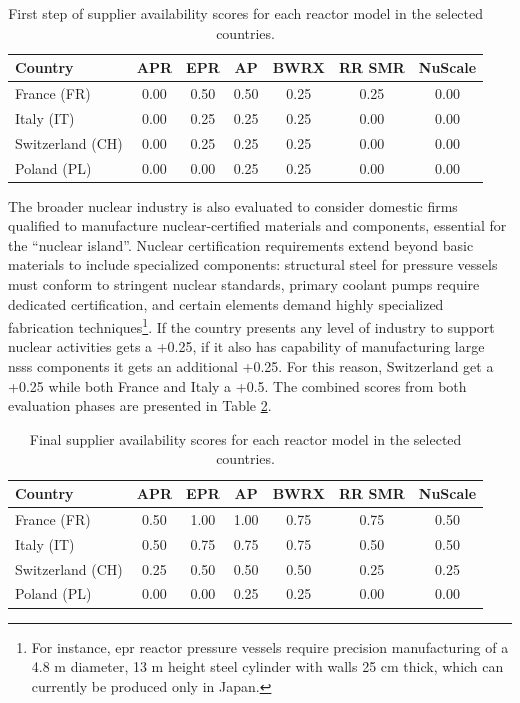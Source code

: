 \begin{table}[!ht]
    \centering
    \begin{tabularx}{\textwidth}{X c c c c c c}
        \toprule
        \textbf{Country} & \textbf{APR} & \textbf{EPR} & \textbf{AP} & \textbf{BWRX} & \textbf{RR SMR} & \textbf{NuScale} \\
        \midrule
        France (FR)       & 0.00 & 0.50 & 0.50 & 0.25 & 0.25 & 0.00 \\
        Italy (IT)       & 0.00 & 0.25 & 0.25 & 0.25 & 0.00 & 0.00 \\
        Switzerland (CH)  & 0.00 & 0.25 & 0.25 & 0.25 & 0.00 & 0.00 \\
        Poland (PL)       & 0.00 & 0.00 & 0.25 & 0.25 & 0.00 & 0.00 \\
        \bottomrule
    \end{tabularx}
    \caption{First step of supplier availability scores for each reactor model in the selected countries.}
    \label{tab:supplier-availability-step1}
\end{table}

The broader nuclear industry is also evaluated to consider domestic firms qualified to manufacture nuclear-certified materials and components, essential for the “nuclear island”. Nuclear certification requirements extend beyond basic materials to include specialized components: structural steel for pressure vessels must conform to stringent nuclear standards, primary coolant pumps require dedicated certification, and certain elements demand highly specialized fabrication techniques\footnote{For instance, \gls{epr} reactor pressure vessels require precision manufacturing of a 4.8 m diameter, 13 m height steel cylinder with walls 25 cm thick, which can currently be produced only in Japan.}. If the country presents any level of industry to support nuclear activities gets a +0.25, if it also has capability of manufacturing large \gls{nsss} components it gets an additional +0.25. For this reason, Switzerland get a +0.25 while both France and Italy a +0.5. The combined scores from both evaluation phases are presented in Table \ref{tab:supplier-availability-step2}.

\begin{table}[!ht]
    \centering
    \begin{tabularx}{\textwidth}{X c c c c c c}
        \toprule
        \textbf{Country} & \textbf{APR} & \textbf{EPR} & \textbf{AP} & \textbf{BWRX} & \textbf{RR SMR} & \textbf{NuScale} \\
        \midrule
        France (FR)       & 0.50 & 1.00 & 1.00 & 0.75 & 0.75 & 0.50 \\
        Italy (IT)       & 0.50 & 0.75 & 0.75 & 0.75 & 0.50 & 0.50 \\
        Switzerland (CH)  & 0.25 & 0.50 & 0.50 & 0.50 & 0.25 & 0.25 \\
        Poland (PL)       & 0.00 & 0.00 & 0.25 & 0.25 & 0.00 & 0.00 \\
        \bottomrule
    \end{tabularx}
    \caption{Final supplier availability scores for each reactor model in the selected countries.}
    \label{tab:supplier-availability-step2}
\end{table}

